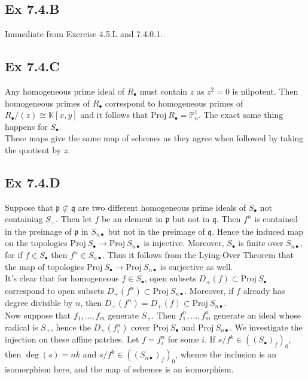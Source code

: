\documentclass{article}
\theoremstyle{definition}
\newcommand{\K}{\mathbb{K}}
\renewcommand{\P}{\mathbb{P}}
\newcommand{\Proj}{\text{Proj}}
\begin{document}
\subsection*{Ex 7.4.B}

Immediate from Exercise 4.5.L and 7.4.0.1.

\subsection*{Ex 7.4.C}

Any homogeneous prime ideal of $R_{\bullet}$ must contain $z$ as $z^{2} = 0$ is
nilpotent. Then homogeneous primes of $R_{\bullet}$ correspond to homogeneous
primes of $R_{\bullet}/(z) \cong \K[x, y]$ and it follows that $\Proj\
	R_{\bullet} = \P^{1}_{n}$. The exact same thing happens for $S_{\bullet}$. \\

These maps give the same map of schemes as they agree when followed by taking
the quotient by $z$. \\

\subsection*{Ex 7.4.D}

Suppose that $\mathfrak{p} \not \subset \mathfrak{q}$ are two different
homogeneous prime ideals of $S_{\bullet}$ not containing $S_{+}$. Then let $f$
be an element in $\mathfrak{p}$ but not in $\mathfrak{q}$. Then $f^{n}$ is
contained in the preimage of $\mathfrak{p}$ in $S_{n \bullet}$ but not in the
preimage of $\mathfrak{q}$. Hence the induced map on the topologies $\Proj\
	S_{\bullet} \to \Proj\ S_{n \bullet}$ is injective. Moreover, $S_{\bullet}$ is
finite over $S_{n \bullet}$, for if $f \in S_{\bullet}$ then $f^{n} \in S_{n
			\bullet}$. Thus it follows from the Lying-Over Theorem that the map of
topologies $\Proj\ S_{\bullet} \to \Proj\ S_{n \bullet}$ is surjective as well.
\\

It's clear that for homogeneous $f \in S_{\bullet}$, open subsets $D_{+}(f)
	\subset \Proj\ S_{\bullet}$ correspond to open subsets $D_{+}(f^{n}) \subset
	\Proj\ S_{n \bullet}$. Moreover, if $f$ already has degree divisible by $n$, then
$D_{+}(f^{n}) = D_{+}(f) \subset \Proj\ S_{n \bullet}$. \\

Now suppose that $f_{1}, \ldots, f_m$ generate $S_{+}$. Then $f_{1}^{n},
	\ldots, f_m^{n}$ generate an ideal whose radical is $S_{+}$, hence the
$D_{+}(f_i^{n})$ cover $\Proj\ S_{\bullet}$ and $\Proj\ S_{n \bullet}$. We
investigate the injection on these affine patches. Let $f = f_i^{n}$ for some
$i$. If $s/f^{k} \in ((S_{\bullet})_f)_0$, then $\deg(s) = nk$ and $s/f^{k} \in
	((S_{n \bullet})_f)_0$, whence the inclusion is an isomorphism here, and the
map of schemes is an isomorphism.
\end{document}
